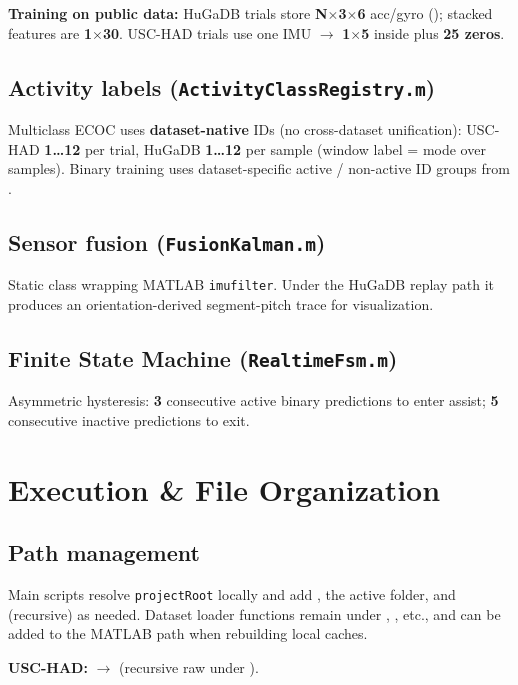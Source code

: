 \documentclass[11pt,a4paper]{article}
\begin{document}
\textbf{Training on public data:} HuGaDB trials store \textbf{N$\times$3$\times$6} acc/gyro (); stacked features are \textbf{1$\times$30}. USC-HAD trials use one IMU $\rightarrow$ \textbf{1$\times$5} inside  plus \textbf{25 zeros}.

\subsection{Activity labels (\texttt{ActivityClassRegistry.m})}
Multiclass ECOC uses \textbf{dataset-native} IDs (no cross-dataset unification): USC-HAD \textbf{1\ldots12} per trial, HuGaDB \textbf{1\ldots12} per sample (window label = mode over samples). Binary training uses dataset-specific active / non-active ID groups from .

\subsection{Sensor fusion (\texttt{FusionKalman.m})}
Static class wrapping MATLAB \texttt{imufilter}. Under the HuGaDB replay path it produces an orientation-derived segment-pitch trace for visualization.

\subsection{Finite State Machine (\texttt{RealtimeFsm.m})}
Asymmetric hysteresis: \textbf{3} consecutive active binary predictions to enter assist; \textbf{5} consecutive inactive predictions to exit.

\section{Execution \& File Organization}

\subsection{Path management}
Main scripts resolve \texttt{projectRoot} locally and add , the active  folder, and  (recursive) as needed. Dataset loader functions remain under , , etc., and can be added to the MATLAB path when rebuilding local caches.

\textbf{USC-HAD:}  $\rightarrow$  (recursive raw  under ).
\end{document}
